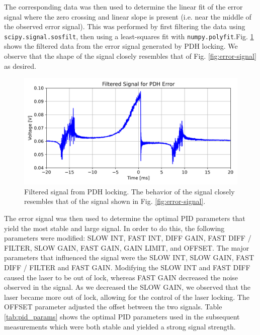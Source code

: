 \documentclass[a4paper]{report}
\numberwithin{equation}{section}
\begin{document}
The corresponding data was then used to determine the linear fit of the error signal where the zero crossing and 
linear slope is present (i.e. near the middle of the observed error signal). 
This was performed by first filtering the data using \texttt{scipy.signal.sosfilt}, then using a least-squares fit with 
\texttt{numpy.polyfit}.Fig. \ref{fig:pdh_err_filt} shows the filtered data from the error signal generated by PDH locking. We observe that the shape of the signal closely
resembles that of Fig. \ref{fig:error-signal} as desired. 

 \begin{figure}[h!]
	\centering
	\includegraphics[width=0.8\columnwidth]{pdh_err_filt.png}
	\caption{Filtered signal from PDH locking. The behavior of the signal closely resembles that of the signal 
	shown in Fig. \ref{fig:error-signal}. }
	\label{fig:pdh_err_filt}
\end{figure}


The error signal was then used to determine the optimal PID parameters that yield the most stable and large signal. In order to 
do this, the following parameters were modified: SLOW INT, FAST INT, DIFF GAIN, FAST DIFF / FILTER, SLOW GAIN, FAST GAIN, GAIN LIMIT, and OFFSET. The major parameters that influenced the signal were the SLOW INT, SLOW GAIN, FAST DIFF / FILTER and FAST GAIN. Modifying the SLOW INT and FAST DIFF caused the laser to be out of lock, whereas FAST GAIN decreased the noise observed in the signal. As we decreased the SLOW GAIN, we observed that the laser became more out of lock, allowing for the control of the laser locking. The OFFSET parameter adjusted the offset between the two signals. Table \ref{tab:pid_params} 
shows the optimal PID parameters used in the subsequent measurements which were both stable and yielded a strong signal strength. \par 
\end{document}
